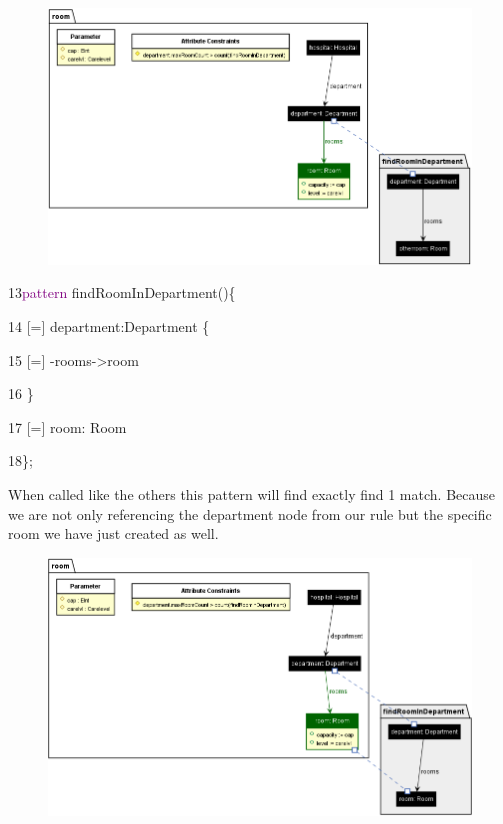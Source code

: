 \begin{figure}[h]
    \centering
    \includegraphics[scale = 0.45]{pictures/roomRule.png}
    \caption{}
    \label{findRooms}
\end{figure}

{

13\hspace{1cm}\textcolor{Purple}{pattern} findRoomInDepartment()\{  

14\hspace{1.5cm} [=] department:Department \{ 

15\hspace{2cm} [=] -rooms->room 

16\hspace{1.5cm} \} 

17\hspace{1.5cm} [=] room: Room

18\hspace{1cm}\};\newline

}

When called like the others this pattern will find exactly find 1 match. Because we are not only referencing the department node from our rule but the specific room we have just created as well.

\begin{figure}[h]
    \centering
    \includegraphics[scale = 0.43]{pictures/findRoomInDepartment.png}
    \caption{}
    \label{attributeConstrains}

\end{figure}


